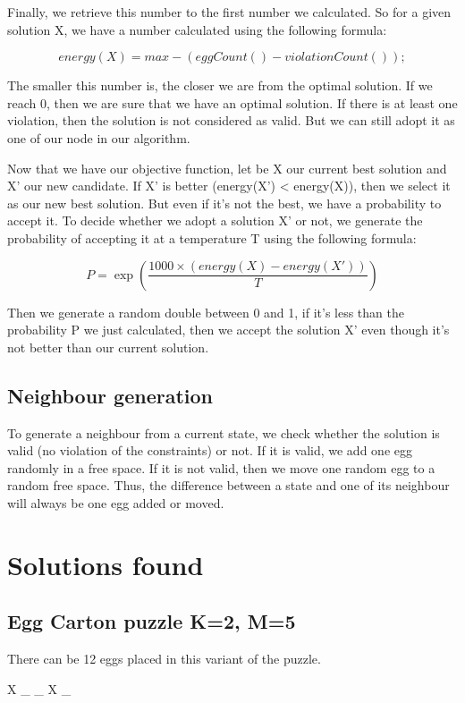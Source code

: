 \documentclass{article}
\begin{document}
Finally, we retrieve this number to the first number we calculated. So for a
given solution X, we have a number calculated using the following formula:

\[
energy(X) = max - (eggCount() - violationCount());
\]

The smaller this number is, the closer we are from the optimal solution. If we
reach 0, then we are sure that we have an optimal solution. If there is at
least one violation, then the solution is not considered as valid. But we can
still adopt it as one of our node in our algorithm.


Now that we have our objective function, let be X our current best solution and
X' our new candidate. If X' is better (energy(X') < energy(X)), then we select
it as our new best solution. But even if it's not the best, we have a
probability to accept it. To decide whether we adopt a solution X' or not, we
generate the probability of accepting it at a temperature T using the following
formula:

\[
 P = \exp(\frac{1000 \times (energy(X) - energy(X'))}{T})
\]

Then we generate a random double between 0 and 1, if it's less than the
probability P we just calculated, then we accept the solution X' even though
it's not better than our current solution.

\subsection{Neighbour generation}

To generate a neighbour from a current state, we check whether the solution is
valid (no violation of the constraints) or not. If it is valid, we add one egg
randomly in a free space. If it is not valid, then we move one random egg to a
random free space. Thus, the difference between a state and one of its neighbour
will always be one egg added or moved.

\section{Solutions found}

\subsection{Egg Carton puzzle K=2, M=5}

There can be 12 eggs placed in this variant of the puzzle.

X \_ \_ X \_ 
\end{document}

